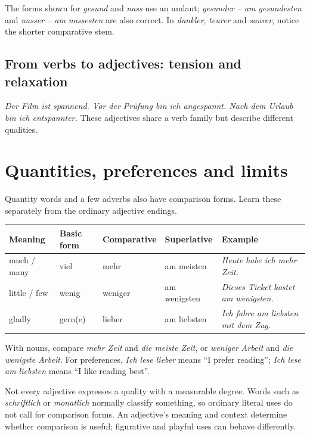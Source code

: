 The forms shown for \textit{gesund} and \textit{nass} use an umlaut;
\textit{gesunder -- am gesundesten} and \textit{nasser -- am nassesten}
are also correct. In \textit{dunkler}, \textit{teurer} and \textit{saurer},
notice the shorter comparative stem.

\subsection{From verbs to adjectives: tension and relaxation}

\textit{Der Film ist spannend. Vor der Prüfung bin ich angespannt.
Nach dem Urlaub bin ich entspannter.}
These adjectives share a verb family but describe different qualities.

\clearpage
\section{Quantities, preferences and limits}

Quantity words and a few adverbs also have comparison forms. Learn these
separately from the ordinary adjective endings.

\begin{center}
\small
{}
\begin{tabularx}{\textwidth}{@{}llllX@{}}
\toprule
Meaning & Basic form & Comparative & Superlative & Example \\
\midrule
much / many & viel & mehr & am meisten & \textit{Heute habe ich mehr Zeit.} \\
little / few & wenig & weniger & am wenigsten & \textit{Dieses Ticket kostet am wenigsten.} \\
gladly & gern(e) & lieber & am liebsten & \textit{Ich fahre am liebsten mit dem Zug.} \\
\bottomrule
\end{tabularx}
\end{center}

With nouns, compare \textit{mehr Zeit} and \textit{die meiste Zeit},
or \textit{weniger Arbeit} and \textit{die wenigste Arbeit}.
For preferences, \textit{Ich lese lieber} means ``I prefer reading'';
\textit{Ich lese am liebsten} means ``I like reading best''.

Not every adjective expresses a quality with a measurable degree.
Words such as \textit{schriftlich} or \textit{monatlich} normally classify
something, so ordinary literal uses do not call for comparison forms.
An adjective's meaning and context determine whether comparison is useful;
figurative and playful uses can behave differently.
